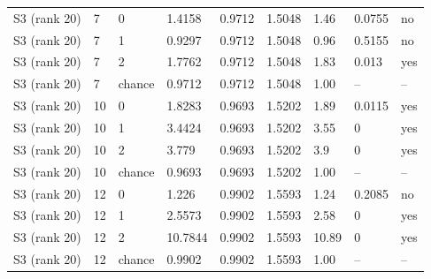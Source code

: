 \begin{table}[t]
\begin{tabular}{lllllllll}
S3 (rank 20) & 7 & 0 & 1.4158 & 0.9712 & 1.5048 & 1.46 & 0.0755 & no \\
S3 (rank 20) & 7 & 1 & 0.9297 & 0.9712 & 1.5048 & 0.96 & 0.5155 & no \\
S3 (rank 20) & 7 & 2 & 1.7762 & 0.9712 & 1.5048 & 1.83 & 0.013 & yes \\
S3 (rank 20) & 7 & chance & 0.9712 & 0.9712 & 1.5048 & 1.00 & -- & -- \\
S3 (rank 20) & 10 & 0 & 1.8283 & 0.9693 & 1.5202 & 1.89 & 0.0115 & yes \\
S3 (rank 20) & 10 & 1 & 3.4424 & 0.9693 & 1.5202 & 3.55 & 0 & yes \\
S3 (rank 20) & 10 & 2 & 3.779 & 0.9693 & 1.5202 & 3.9 & 0 & yes \\
S3 (rank 20) & 10 & chance & 0.9693 & 0.9693 & 1.5202 & 1.00 & -- & -- \\
S3 (rank 20) & 12 & 0 & 1.226 & 0.9902 & 1.5593 & 1.24 & 0.2085 & no \\
S3 (rank 20) & 12 & 1 & 2.5573 & 0.9902 & 1.5593 & 2.58 & 0 & yes \\
S3 (rank 20) & 12 & 2 & 10.7844 & 0.9902 & 1.5593 & 10.89 & 0 & yes \\
S3 (rank 20) & 12 & chance & 0.9902 & 0.9902 & 1.5593 & 1.00 & -- & -- \\
\bottomrule
\end{tabular}
\end{table}
